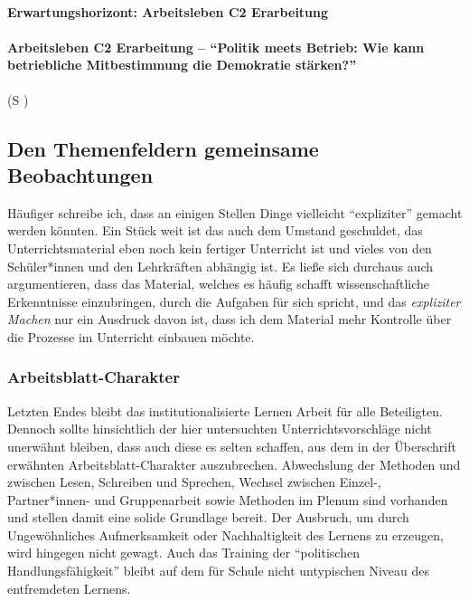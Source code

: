 \paragraph{Erwartungshorizont: Arbeitsleben C2 Erarbeitung}

\paragraph{Arbeitsleben C2 Erarbeitung -- \enquote{Politik meets Betrieb: Wie kann betriebliche Mitbestimmung die Demokratie stärken?}} (\gls{S} \pageref{ARBEITSLEBEN-C2})











\subsection{Den Themenfeldern gemeinsame Beobachtungen}
Häufiger schreibe ich, dass an einigen Stellen Dinge vielleicht \enquote{expliziter} gemacht werden könnten. Ein Stück weit ist das auch dem Umstand geschuldet, das Unterrichtsmaterial eben noch kein fertiger Unterricht ist und vieles von den Schüler*innen und den Lehrkräften abhängig ist. Es ließe sich durchaus auch argumentieren, dass das Material, welches es häufig schafft wissenschaftliche Erkenntnisse einzubringen, durch die Aufgaben für sich spricht, und das \emph{expliziter Machen} nur ein Ausdruck davon ist, dass ich dem Material mehr Kontrolle über die Prozesse im Unterricht einbauen möchte. 


\subsubsection{Arbeitsblatt-Charakter}
Letzten Endes bleibt das institutionalisierte Lernen Arbeit für alle Beteiligten. Dennoch sollte hinsichtlich der hier untersuchten Unterrichtsvorschläge nicht unerwähnt bleiben, dass auch diese es selten schaffen, aus dem in der Überschrift erwähnten Arbeitsblatt-Charakter auszubrechen. Abwechslung der Methoden und zwischen Lesen, Schreiben und Sprechen, Wechsel zwischen Einzel-, Partner*innen- und Gruppenarbeit sowie Methoden im Plenum sind vorhanden und stellen damit eine solide Grundlage bereit. Der Ausbruch, um durch Ungewöhnliches Aufmerksamkeit oder Nachhaltigkeit des Lernens zu erzeugen, wird hingegen nicht gewagt. 
Auch das Training der \enquote{politischen Handlungsfähigkeit} bleibt auf dem für Schule nicht untypischen Niveau des entfremdeten Lernens. 


